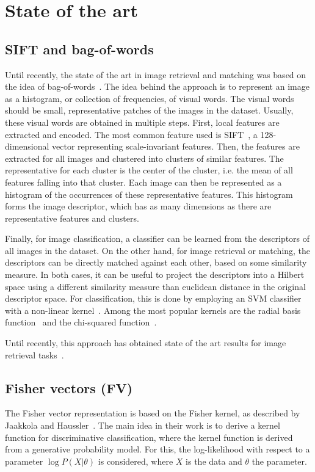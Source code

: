 
\chapter{State of the art}
\section{SIFT and bag-of-words}\label{sec:sift}
Until recently, the state of the art in image retrieval and matching
was based on the idea of
bag-of-words~\cite{philbin_object_2007,mikulik_learning_2013}.
The idea behind the approach is to represent an image as a histogram,
or collection of frequencies, of visual words. The visual words should
be small, representative patches of the images in the dataset.
Usually, these visual words are obtained in multiple steps. First,
local features are extracted and encoded. The most common feature used
is SIFT~\cite{lowe_distinctive_2004}, a 128-dimensional vector representing
scale-invariant features. Then, the features are extracted for all
images and clustered into clusters of similar features.
The representative for each cluster is the center of the cluster,
i.e. the mean of all features falling into that cluster.
Each image can then be represented as a histogram of the occurrences
of these representative features.
This histogram forms the image descriptor, which has as many dimensions
as there are representative features and clusters.

Finally, for image classification, a classifier can be learned from the
descriptors of all images in the dataset. On the other hand, for image
retrieval or matching, the descriptors can be directly matched against
each other, based on some similarity measure.
In both cases, it can be useful to project the descriptors into a Hilbert
space using a different similarity measure than euclidean distance
in the original descriptor space.
For classification, this is done by employing an SVM classifier with a
non-linear kernel~\cite{shawe-taylor_kernel_2004}.
Among the most popular kernels are the
radial basis function~\cite{scholkopf_comparing_1997}
and the chi-squared function~\cite{vedaldi_efficient_2012}.

Until recently, this approach has obtained state of the art results for
image retrieval tasks~\cite{mikulik_learning_2013}.

\section{Fisher vectors (FV)}\label{sec:fv}
The Fisher vector representation is based on the Fisher kernel, as described
by Jaakkola and Haussler~\cite{jaakkola_exploiting_1999}. The main idea
in their work is to derive a kernel function for discriminative classification,
where the kernel function is derived from a generative probability model.
For this, the log-likelihood with respect to a parameter $\log P(X|\theta)$
is considered, where $X$ is the data and $\theta$ the parameter.

